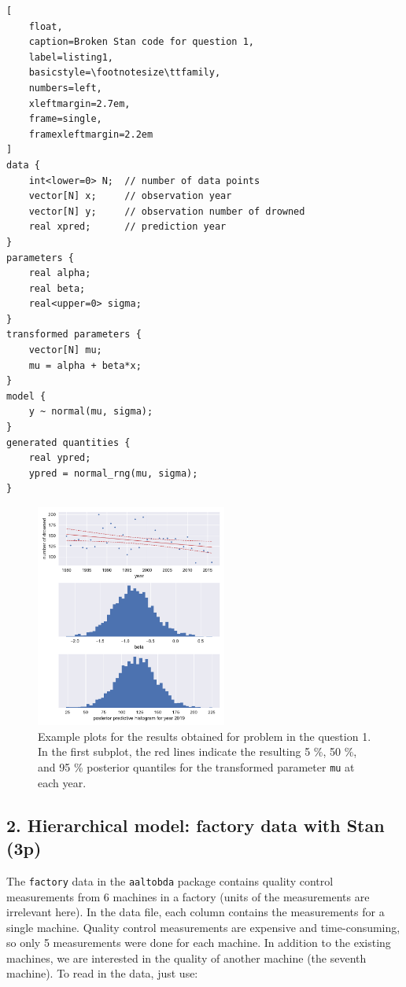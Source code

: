 \documentclass[a4paper,11pt]{article}
\begin{document}
\begin{lstlisting}[
    float,
    caption=Broken Stan code for question 1,
    label=listing1,
    basicstyle=\footnotesize\ttfamily,
    numbers=left,
    xleftmargin=2.7em,
    frame=single,
    framexleftmargin=2.2em
]
data {
    int<lower=0> N;  // number of data points
    vector[N] x;     // observation year
    vector[N] y;     // observation number of drowned
    real xpred;      // prediction year
}
parameters {
    real alpha;
    real beta;
    real<upper=0> sigma;
}
transformed parameters {
    vector[N] mu;
    mu = alpha + beta*x;
}
model {
    y ~ normal(mu, sigma);
}
generated quantities {
    real ypred;
    ypred = normal_rng(mu, sigma);
}
\end{lstlisting}

\begin{figure}[htb]
\centering
   \includegraphics[width=0.56\textwidth]{ex7_fig1.pdf}
\caption{Example plots for the results obtained for problem in the question 1. In the first subplot, the red lines indicate the resulting 5 \%, 50 \%, and 95 \% posterior quantiles for the transformed parameter {\tt mu} at each year.}\label{fig1}
\end{figure}


\newpage

\subsection*{2. Hierarchical model: factory data with Stan (3p)}

The {\tt factory} data in the {\tt aaltobda} package contains quality control measurements from 6 machines in a factory (units of the measurements are irrelevant here). In the data file, each column contains the measurements for a single machine. Quality control measurements are expensive and time-consuming, so only 5 measurements were done for each machine. In addition to the existing machines, we are interested in the quality of another machine (the seventh machine). To read in the data, just use:
\end{document}

